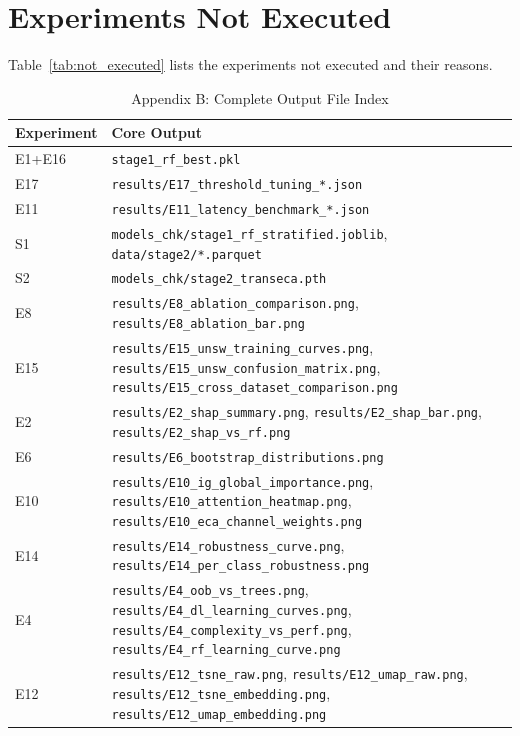\documentclass[sigconf]{acmart}
\begin{document}
\section{Experiments Not Executed} Table~\ref{tab:not_executed} lists the experiments not executed and their reasons.


\begin{table}[!t]
\caption{Appendix B: Complete Output File Index}
\label{tab:output_index}
\small
\begin{tabular}{p{1.8cm}p{14.2cm}}
\toprule
\textbf{Experiment} & \textbf{Core Output} \\
\midrule
E1+E16 & \texttt{stage1\_rf\_best.pkl} \\
E17 & \texttt{results/E17\_threshold\_tuning\_*.json} \\
E11 & \texttt{results/E11\_latency\_benchmark\_*.json} \\
S1 & \texttt{models\_chk/stage1\_rf\_stratified.joblib}, \texttt{data/stage2/*.parquet} \\
S2 & \texttt{models\_chk/stage2\_transeca.pth} \\
E8 & \texttt{results/E8\_ablation\_comparison.png}, \texttt{results/E8\_ablation\_bar.png} \\
E15 & \texttt{results/E15\_unsw\_training\_curves.png}, \texttt{results/E15\_unsw\_confusion\_matrix.png}, \texttt{results/E15\_cross\_dataset\_comparison.png} \\
E2 & \texttt{results/E2\_shap\_summary.png}, \texttt{results/E2\_shap\_bar.png}, \texttt{results/E2\_shap\_vs\_rf.png} \\
E6 & \texttt{results/E6\_bootstrap\_distributions.png} \\
E10 & \texttt{results/E10\_ig\_global\_importance.png}, \texttt{results/E10\_attention\_heatmap.png}, \texttt{results/E10\_eca\_channel\_weights.png} \\
E14 & \texttt{results/E14\_robustness\_curve.png}, \texttt{results/E14\_per\_class\_robustness.png} \\
E4 & \texttt{results/E4\_oob\_vs\_trees.png}, \texttt{results/E4\_dl\_learning\_curves.png}, \texttt{results/E4\_complexity\_vs\_perf.png}, \texttt{results/E4\_rf\_learning\_curve.png} \\
E12 & \texttt{results/E12\_tsne\_raw.png}, \texttt{results/E12\_umap\_raw.png}, \texttt{results/E12\_tsne\_embedding.png}, \texttt{results/E12\_umap\_embedding.png} \\
\bottomrule
\end{tabular}
\end{table}
\end{document}
